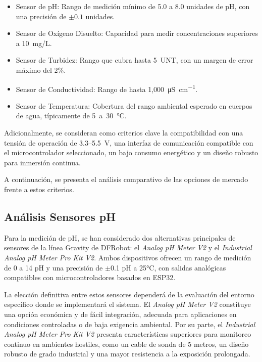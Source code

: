 \begin{itemize}
    \item Sensor de pH: Rango de medición mínimo de 5.0 a 8.0 unidades de pH, con una precisión de $\pm0.1$ unidades.
    
    \item Sensor de Oxígeno Disuelto: Capacidad para medir concentraciones superiores a 10~mg/L.
    
    \item Sensor de Turbidez: Rango que cubra hasta 5~UNT, con un margen de error máximo del 2\%.
    
    \item Sensor de Conductividad: Rango de hasta 1{,}000~\si{\micro\siemens\per\centi\meter}.
    
    \item Sensor de Temperatura: Cobertura del rango ambiental esperado en cuerpos de agua, típicamente de 5~a~30~\si{\celsius}.
\end{itemize}

Adicionalmente, se consideran como criterios clave la compatibilidad con una tensión de operación de 3.3--5.5~V, una interfaz de comunicación compatible con el microcontrolador seleccionado, un bajo consumo energético y un diseño robusto para inmersión continua. 

A continuación, se presenta el análisis comparativo de las opciones de mercado frente a estos criterios.

\subsection{Análisis Sensores pH}
\label{subsec:analisis_sensores_ph}

Para la medición de pH, se han considerado dos alternativas principales de sensores de la línea Gravity de DFRobot: el \textit{Analog pH Meter V2} y el \textit{Industrial Analog pH Meter Pro Kit V2}. Ambos dispositivos ofrecen un rango de medición de 0 a 14 pH y una precisión de $\pm$0.1 pH a 25°C, con salidas analógicas compatibles con microcontroladores basados en ESP32.

La elección definitiva entre estos sensores dependerá de la evaluación del entorno específico donde se implementará el sistema. El \textit{Analog pH Meter V2} constituye una opción económica y de fácil integración, adecuada para aplicaciones en condiciones controladas o de baja exigencia ambiental. Por su parte, el \textit{Industrial Analog pH Meter Pro Kit V2} presenta características superiores para monitoreo continuo en ambientes hostiles, como un cable de sonda de 5 metros, un diseño robusto de grado industrial y una mayor resistencia a la exposición prolongada.

